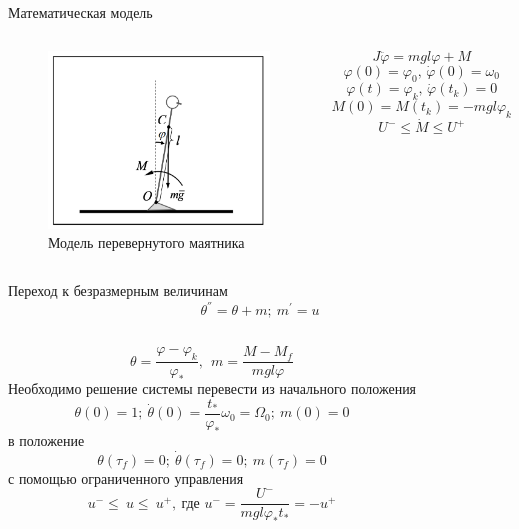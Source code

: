 \documentclass[10pt]{beamer}
\begin{document}
\begin{frame}{Математическая модель}
	\begin{columns}
		\begin{figure}[h!]
			\includegraphics[width=1\linewidth]{images/inverse_pendulum.png}
			\caption{Модель перевернутого маятника}
		\end{figure}

		\[
			J\ddot{\varphi}=mgl\varphi+M
		\]
		\[
			\varphi(0)=\varphi_0,\, \dot{\varphi}(0)=\omega_0
		\]
		\[
			\varphi(t)=\varphi_k,\, \dot{\varphi}(t_k)=0
		\]
		\[
			M(0)=M(t_k)=-mgl\varphi_k
		\]
		\[
			U^-\leq\dot{M}\leq U^+
		\]
	\end{columns}
\end{frame}


\begin{frame}{Переход к безразмерным величинам}
	\[
		\theta^{''}=\theta+m;\ m^{'}=u
	\]
	\begin{columns}
		\column{0.3\textwidth}
		\[
			\theta=\frac{\varphi-\varphi_k}{\varphi_\ast},\ \ m=\frac{M-M_f}{mgl\varphi}
		\]
		\column{0.6\textwidth}
		Необходимо решение системы
		перевести из начального положения
		\[
			\theta(0)=1;\ \dot{\theta}(0)=\frac{t_\ast}{\varphi_\ast}\omega_0=\Omega_0;\ m(0)=0
		\]
		в положение
		\[
			\theta(\tau_f)=0;\ \dot{\theta}(\tau_f)=0;\ m(\tau_f)=0
		\]
		с помощью ограниченного управления
		\[
			u^-\le\ u\le\ u^+,\ \text{где } u^-=\frac{U^-}{mgl\varphi_\ast t_\ast}=-u^+
		\]

	\end{columns}
\end{frame}
\end{document}
